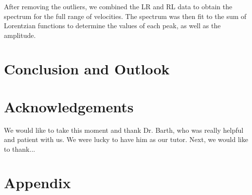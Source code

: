 \documentclass[a4paper]{report}
\numberwithin{equation}{section}
\begin{document}



After removing the outliers, we combined the LR and RL data to obtain the spectrum for the full range of velocities. The spectrum 
was then fit to the sum of Lorentzian functions to determine the values of each peak, as well as the amplitude. 

\chapter{Conclusion and Outlook}

\chapter{Acknowledgements}
We would like to take this moment and thank Dr. Barth, who was really helpful and patient with us. We were lucky to have him as our tutor. Next, we would like to thank...


\printbibliography

\chapter{Appendix} \label{sec:Appendix}
\end{document}
